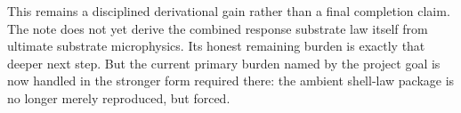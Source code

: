 \documentclass[11pt]{article}
\begin{document}
This remains a disciplined derivational gain rather than a final completion claim. The note does not yet derive the combined response substrate law itself from ultimate substrate microphysics. Its honest remaining burden is exactly that deeper next step. But the current primary burden named by the project goal is now handled in the stronger form required there: the ambient shell-law package is no longer merely reproduced, but forced.
\end{document}
